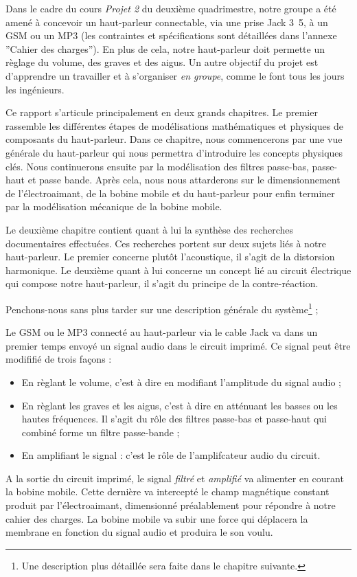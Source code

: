 

Dans le cadre du cours \textit{Projet 2} du deuxième quadrimestre, notre groupe a été amené à 
concevoir un haut-parleur connectable, via une prise Jack \unit{3.5}{\milli\meter}, à un 
GSM ou un MP3 (les contraintes et spécifications sont détaillées dans l'annexe ''Cahier des charges''). 
En plus de cela, notre haut-parleur doit permette un règlage du volume, des graves
et des aigus. Un autre objectif du projet est d'apprendre un travailler et à s'organiser \textit{en groupe}, 
comme le font tous les jours les ingénieurs.

Ce rapport s'articule principalement en deux grands chapitres. Le premier
rassemble les différentes étapes de modélisations mathématiques
et physiques de composants du haut-parleur. Dans ce chapitre, nous 
commencerons par une vue générale du haut-parleur qui nous
permettra d'introduire les concepts physiques clés. Nous continuerons
ensuite par la modélisation des filtres passe-bas, passe-haut et passe bande.
Après cela, nous nous attarderons  sur le dimensionnement de l'électroaimant, de la bobine mobile et du haut-parleur pour enfin terminer par la modélisation mécanique de la bobine
mobile.

Le deuxième chapitre contient quant à lui la synthèse des recherches documentaires
effectuées. Ces recherches portent sur deux sujets liés à notre haut-parleur. Le premier
concerne plutôt l'acoustique, il s'agit de la 
distorsion harmonique. Le deuxième quant à lui concerne un concept lié au circuit électrique qui
compose notre haut-parleur, il s'agit du principe de la contre-réaction.

Penchons-nous sans plus tarder sur une description générale du système\footnote{Une
description plus détaillée sera faite dans le chapitre suivante.} ; 

Le GSM ou le MP3 connecté au haut-parleur via le cable Jack va dans un premier temps envoyé un signal audio dans le 
circuit imprimé. Ce signal peut être modififié de trois façons :

\begin{itemize}
	\item En règlant le volume, c'est à dire en modifiant l'amplitude du signal audio ;
	\item En règlant les graves et les aigus, c'est à dire en atténuant les basses ou les hautes
	fréquences. Il s'agit du rôle des filtres passe-bas et passe-haut qui combiné forme un filtre 
	passe-bande ;
 \item En amplifiant le signal : c'est le rôle de l'amplifcateur audio du circuit.
\end{itemize}
 
A la sortie du circuit imprimé, le signal \textit{filtré} et \textit{amplifié} va alimenter en courant la bobine mobile.
Cette dernière va intercepté le champ magnétique constant produit par l'électroaimant, dimensionné préalablement
pour répondre à notre cahier des charges. La bobine mobile va subir une force qui déplacera la membrane en fonction
du signal audio et produira le son voulu.

